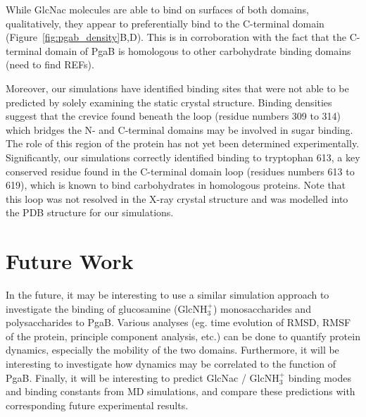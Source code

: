 While GlcNac molecules are able to bind on surfaces of both domains, qualitatively, they appear to preferentially bind to the C-terminal domain (Figure~\ref{fig:pgab_density}B,D). This is in corroboration with the fact that the C-terminal domain of PgaB is homologous to other carbohydrate binding domains (need to find REFs).

Moreover, our simulations have identified binding sites that were not able to be predicted by solely examining the static crystal structure. Binding densities suggest that the crevice found beneath the loop (residue numbers 309 to 314) which bridges the N- and C-terminal domains may be involved in sugar binding. The role of this region of the protein has not yet been determined experimentally. Significantly, our simulations correctly identified binding to tryptophan 613, a key conserved residue found in the C-terminal domain loop (residues numbers 613 to 619), which is known to bind carbohydrates in homologous proteins. Note that this loop was not resolved in the X-ray crystal structure and was modelled into the PDB structure for our simulations.


\section{Future Work}
In the future, it may be interesting to use a similar simulation approach to investigate the binding of glucosamine (GlcNH$_3^+$) monosaccharides and polysaccharides to PgaB.  Various analyses (eg. time evolution of RMSD, RMSF of the protein, principle component analysis, etc.) can be done to quantify protein dynamics, especially the mobility of the two domains. Furthermore, it will be interesting to investigate how dynamics may be correlated to the function of PgaB.  Finally, it will be interesting to predict GlcNac / GlcNH$_3^+$ binding modes and binding constants from MD simulations, and compare these predictions with corresponding future experimental results.



